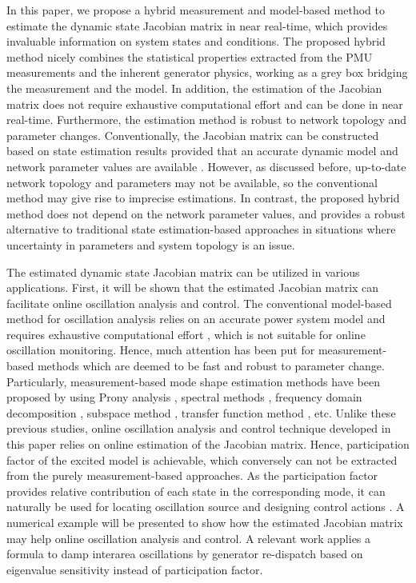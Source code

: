 \documentclass[journal]{IEEEtran}
\begin{document}
In this paper, we propose a hybrid measurement and model-based method to estimate the dynamic state Jacobian matrix in near real-time, which provides invaluable information on system states and conditions. The proposed hybrid method nicely combines the statistical properties extracted from the PMU measurements and the inherent generator physics, working as a grey box bridging the measurement and the model. In addition, the estimation of the Jacobian matrix does not require exhaustive computational effort and can be done in near real-time. Furthermore, the estimation method is robust to network topology and parameter changes.
Conventionally, the Jacobian matrix can be constructed based on state estimation results provided that an accurate dynamic model and network parameter values are available \cite{Abur:book}. However, as discussed before, up-to-date network topology and parameters may not be available, so the conventional method may give rise to imprecise estimations. In contrast, the proposed hybrid method does not depend on the network parameter values, and provides a robust alternative to traditional state estimation-based approaches in situations where uncertainty in parameters and system topology is an issue.


The estimated dynamic state Jacobian matrix can be utilized in various applications. First, it will be shown that the estimated Jacobian matrix can facilitate online oscillation analysis and control.
The conventional model-based method for oscillation analysis relies on an accurate power system model and requires exhaustive computational effort \cite{Zhou:2007}, which is not suitable for online oscillation monitoring. Hence, much attention has been put for measurement-based methods which are deemed to be fast and robust to parameter change.
Particularly, measurement-based mode shape estimation methods have been proposed by using Prony analysis \cite{Scharf:1990}, spectral methods \cite{Trudnowski:2008}\cite{Zhou:2013PES}, frequency domain decomposition \cite{Venkatasubramanian:2008}, subspace method \cite{Zhou:2007}\cite{Liu:2011PES}, transfer function method \cite{Zhou:2009PES}, etc. Unlike these previous studies, online oscillation analysis and control technique developed in this paper relies on online estimation of the Jacobian matrix. Hence, participation factor of the excited model is achievable, which conversely can not be extracted from the purely measurement-based approaches. As the participation factor provides relative contribution of each state in the corresponding mode, it can naturally be used for locating oscillation source and designing control actions \cite{Kundur:book}. A numerical example will be presented to show how the estimated Jacobian matrix may help online oscillation analysis and control. A relevant work \cite{Dobson:2015} applies a formula to damp interarea oscillations by generator re-dispatch based on eigenvalue sensitivity instead of participation factor.
\end{document}
